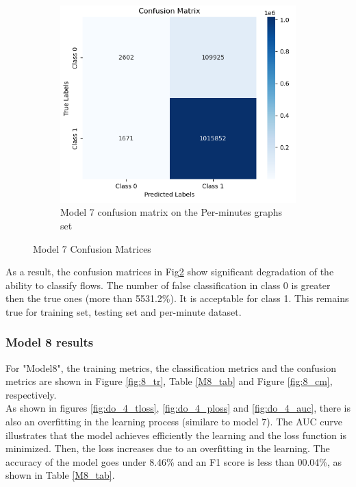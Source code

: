 \begin{figure}[H]
    \begin{subfigure}{0.49\textwidth}
        \centering
        \includegraphics[width=\linewidth]{figures/ev/do_3_cm3.png}
        \caption{Model 7 confusion matrix on the Per-minutes graphs set}
    \label{fig:do_3_cm3}
    \end{subfigure}
    \captionsetup{font=large}
    \caption{Model 7 Confusion Matrices}
    \label{fig:7_cm}
\end{figure}
As a result, the confusion matrices in Fig\ref{fig:7_cm} show significant degradation of the ability to classify flows. The number of false classification in class 0 is greater then the true ones (more than 5531.2\%). It is acceptable for class 1. This remains true for training set, testing set and per-minute dataset.
\subsubsection{Model 8 results}
For "Model8", the training metrics, the classification metrics and the confusion metrics are shown in Figure \ref{fig:8_tr}, Table \ref{M8_tab} and Figure \ref{fig:8_cm}, respectively.\\
  As shown in figures \ref{fig:do_4_tloss}, \ref{fig:do_4_ploss} and \ref{fig:do_4_auc}, there is also an overfitting  in the learning process (similare to model 7). The AUC curve illustrates that the model achieves efficiently the learning and the loss function is minimized. Then, the loss increases due to an overfitting in the learning. The accuracy of the model goes under 8.46\% and an F1 score is less than  00.04\%, as shown in Table \ref{M8_tab}.

